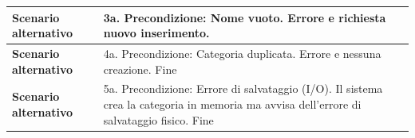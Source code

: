 \documentclass[12pt, a4paper, oneside]{report}
\begin{document}
\begin{tabularx}{\textwidth}{|l|X|}
    \textbf{Scenario alternativo} & 
    3a. Precondizione: Nome vuoto. \newline
    Errore e richiesta nuovo inserimento. \\ \hline

    \textbf{Scenario alternativo} & 
    4a. Precondizione: Categoria duplicata. \newline
    Errore e nessuna creazione. \newline
    Fine \\ \hline

    \textbf{Scenario alternativo} & 
    5a. Precondizione: Errore di salvataggio (I/O). \newline
    Il sistema crea la categoria in memoria ma avvisa dell'errore di salvataggio fisico. \newline
    Fine \\ \hline
\end{tabularx}

\renewcommand{\arraystretch}{1.4} 
\end{document}

